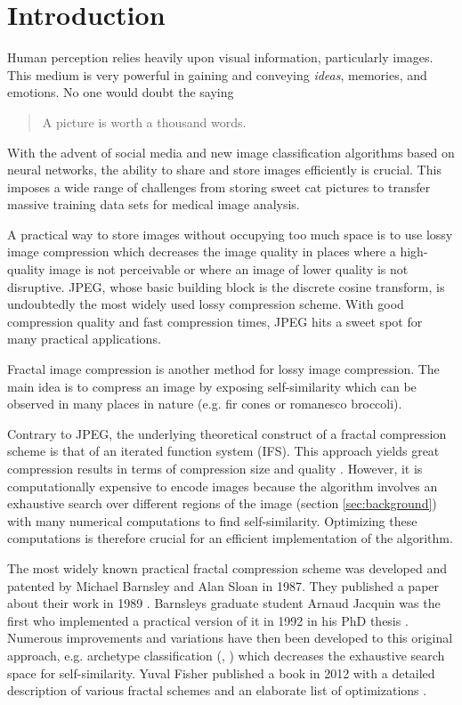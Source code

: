 \section{Introduction}\label{sec:intro}
Human perception relies heavily upon visual information, particularly images.
This medium is very powerful in gaining and conveying \textit{ideas}, memories,
and emotions. No one would doubt the saying
\begin{quote}
A picture is worth a thousand words.
\end{quote}
With the advent of social media and new image classification algorithms based on
neural networks, the ability to share and store images efficiently is crucial.
This imposes a wide range of challenges from storing sweet cat pictures to
transfer massive training data sets for medical image analysis.


A practical way to store images without occupying too much space is to use lossy
image compression which decreases the image quality in places where a
high-quality image is not perceivable or where an image of lower quality is not
disruptive. JPEG, whose basic building block is the discrete cosine transform,
is undoubtedly the most widely used lossy compression scheme. With good
compression quality and fast compression times, JPEG hits a sweet spot for many
practical applications.

Fractal image compression is another method for lossy image compression. The
main idea is to compress an image by exposing self-similarity which can be
observed in many places in nature (e.g. fir cones or romanesco broccoli).

Contrary to JPEG, the underlying theoretical construct of a fractal compression
scheme is that of an iterated function system (IFS). This approach yields great
compression results in terms of compression size and quality \cite{fisher2012}.
However, it is computationally expensive to encode images because the algorithm
involves an exhaustive search over different regions of the image (section
\ref{sec:background}) with many numerical computations to find self-similarity.
Optimizing these computations is therefore crucial for an efficient
implementation of the algorithm.

 The most widely known practical fractal compression scheme
was developed and patented by Michael Barnsley and Alan Sloan in 1987. They
published a paper about their work in 1989 \cite{barnsley1989fractal}. Barnsleys
graduate student Arnaud Jacquin was the first who implemented a practical
version of it in 1992 in his PhD thesis \cite{jacquin1990fractal}. Numerous
improvements and variations have then been developed to this original approach,
e.g. archetype classification (\cite{jacobs1992image}, \cite{boss1991studies})
which decreases the exhaustive search space for self-similarity. Yuval Fisher
published a book in 2012 with a detailed description of various fractal schemes
and an elaborate list of optimizations \cite{fisher2012}.


